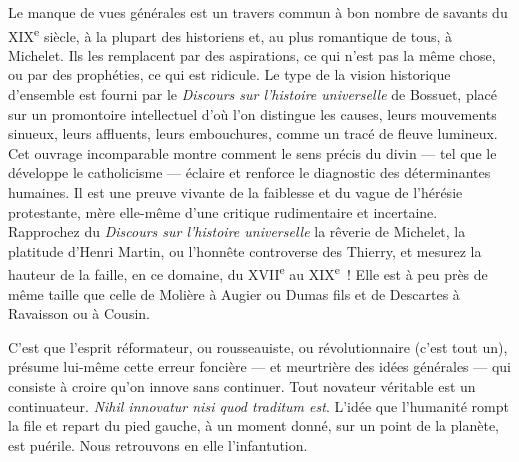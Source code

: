 \documentclass[french,twoside]{book} %
\begin{document}
Le manque de vues générales est un travers commun à bon nombre de savants du XIX\textsuperscript{e} siècle, à la plupart des historiens et, au plus romantique de tous, à Michelet. Ils les remplacent par des aspirations, ce qui n’est pas la même chose, ou par des prophéties, ce qui est ridicule. Le type de la vision historique d’ensemble est fourni par le {\itshape Discours sur l’histoire universelle} de Bossuet, placé sur un promontoire intellectuel d’où l’on distingue les causes, leurs mouvements sinueux, leurs affluents, leurs embouchures, comme un tracé de fleuve lumineux. Cet ouvrage incomparable montre comment le sens précis du divin — tel que le développe le catholicisme — éclaire et renforce le diagnostic des déterminantes humaines. Il est une preuve vivante de la faiblesse et du vague de l’hérésie protestante, mère elle-même d’une critique rudimentaire et incertaine. Rapprochez du {\itshape Discours sur l’histoire universelle} la rêverie de Michelet, la platitude d’Henri Martin, ou l’honnête controverse des Thierry, et mesurez la hauteur de la faille, en ce domaine, du XVII\textsuperscript{e} au XIX\textsuperscript{e} ! Elle est à peu près de même taille que celle de Molière à Augier ou Dumas fils et de Descartes à Ravaisson ou à Cousin.\par
C’est que l’esprit réformateur, ou rousseauiste, ou révolutionnaire (c’est tout un), présume lui-même cette erreur foncière — et meurtrière des idées générales — qui consiste à croire qu’on innove sans continuer. Tout novateur véritable est un continuateur. {\itshape Nihil innovatur nisi quod traditum est}. L’idée que l’humanité rompt la file et repart du pied gauche, à un moment donné, sur un point de la planète, est puérile. Nous retrouvons en elle l’infantution.\par
\end{document}
